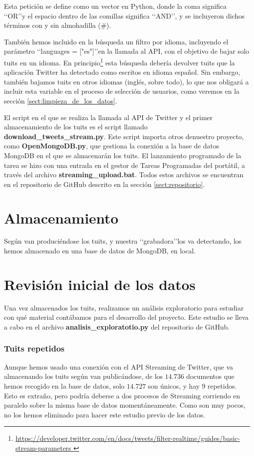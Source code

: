 Esta petición se define como un vector en Python, donde la coma significa \lq\lq OR\rq\rq y el espacio
dentro de las comillas significa \lq\lq AND\rq\rq, y se incluyeron dichos términos con y sin almohadilla 
(\#).

También hemos incluido en la búsqueda un filtro por idioma, incluyendo el parámetro 
\lq\lq languages = ["es"]\rq\rq en la llamada al API, con el objetivo de bajar solo tuits
en un idioma. En principio\footnote{\url{https://developer.twitter.com/en/docs/tweets/filter-realtime/guides/basic-stream-parameters }}
esta búsqueda debería devolver tuits que la aplicación Twitter ha detectado como escritos en
idioma español. Sin embargo, también bajamos tuits en otros idiomas (inglés, sobre todo), lo que
nos obligará a incluir esta variable en el proceso de selección de usuarios, como veremos en la sección \ref{sect:limpieza_de_los_datos}.

El script en el que se realiza la llamada al API de Twitter y el primer almacenamiento de los tuits
es el script llamado {\bf download\_tweets\_stream.py}. Este script importa otros
denuestro proyecto, como {\bf OpenMongoDB.py}, que gestiona la conexión a la base de datos MongoDB
en el que se almacenarán los tuits. El lanzamiento programado de la tarea se hizo con una entrada en el gestor
de Tareas Programadas del portátil, a través del archivo {\bf streaming\_upload.bat}. Todos estos
archivos se encuentran en el repositorio de GitHub descrito en la sección \ref{sect:repositorio}.


\section{Almacenamiento}
Según van produciéndose los tuits, y nuestra \lq\lq grabadora\rq\rq los va detectando, los hemos almacenado
en una base de datos de MongoDB, en local.


\section{Revisión inicial de los datos}
Una vez almacenados los tuits, realizamos un análisis exploratorio para estudiar con qué material contábamos para el desarrollo del proyecto. Este estudio se lleva a cabo en el archivo {\bf analisis\_exploratotio.py} del repositorio de
GitHub.

\subsubsection{Tuits repetidos}
Aunque hemos usado una conexión con el API Streaming de Twitter, que va almacenando los
tuits según van publicándose,  de los $14.736$ documentos que hemos recogido en la base de datos, 
solo $14.727$ son únicos, y hay $9$ repetidos. Esto es extraño, pero podría deberse a dos procesos
de Streaming corriendo en paralelo sobre la misma base de datos momentáneamente. Como son muy pocos, no los hemos eliminado para hacer este estudio previo de los datos.

